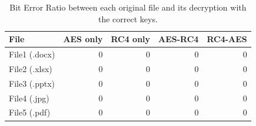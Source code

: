 \begin{table}[htbp]
\centering
\caption{Bit Error Ratio between each original file and its decryption with the correct keys.}
\label{tab:p3_ber}
\small
\begin{tabular}{lrrrr}
\toprule
\textbf{File} & \textbf{AES only} & \textbf{RC4 only} & \textbf{AES-RC4} & \textbf{RC4-AES} \\
\midrule
File1 (.docx) & 0 & 0 & 0 & 0 \\
File2 (.xlsx) & 0 & 0 & 0 & 0 \\
File3 (.pptx) & 0 & 0 & 0 & 0 \\
File4 (.jpg) & 0 & 0 & 0 & 0 \\
File5 (.pdf) & 0 & 0 & 0 & 0 \\
\bottomrule
\end{tabular}
\end{table}
